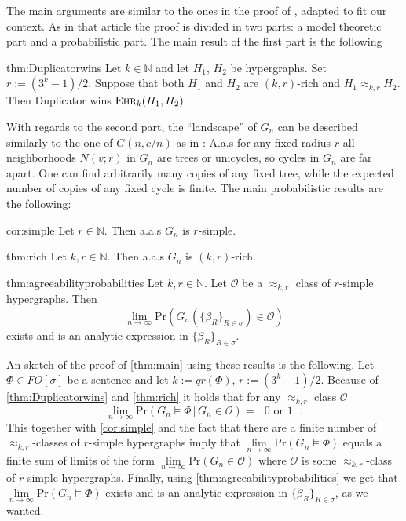 \documentclass[12pt,notitlepage,a4paper]{article}
\theoremstyle{definition}
\newcommand{\N}{\mathbb{N}}
\newcommand{\Ln}{\lim\limits_{n\to \infty}}
\newcommand{\ehr}{\textsc{Ehr}}
\newcommand{\PR}[1]{\mathrm{Pr}\left(#1\right)}
\begin{document}
The main arguments are similar to the ones in the proof of
 \cite[Theorem 2.1]{lynch1992probabilities},
adapted to fit our context. As in that
article the proof is divided in two parts: a model theoretic part and a 
probabilistic part. The main result of the first part is the following

\begin{reptheorem}{thm:Duplicatorwins}
	Let $k\in \N$ and let $H_1$, $H_2$ be hypergraphs. Set $r:=(3^k-1)/2$. Suppose
	that both $H_1$ and $H_2$ are $(k,r)$-rich and
	$H_1\approx_{k,r} H_2$. Then Duplicator wins $\ehr_{k}(H_1,H_2)$
\end{reptheorem}

With regards to the second part, 
the ``landscape'' of $G_n$ can be described similarly to the one 
of $G(n,c/n)$ as in \cite{shelah1994can}: A.a.s for any fixed radius $r$
all neighborhoods $N(v;r)$ in $G_n$ are trees or unicycles, so cycles in 
$G_n$ are far apart. One can find arbitrarily
many copies of any fixed tree, while the expected number of copies 
of any fixed cycle is finite. The main probabilistic results are the
following:
\begin{reptheorem}{cor:simple}
  	Let $r\in \N$. Then a.a.s $G_n$ is $r$-simple.
\end{reptheorem}

\begin{reptheorem}{thm:rich}
	Let $k,r\in \N$. Then a.a.s $G_n$ is $(k,r)$-rich.
\end{reptheorem}


\begin{reptheorem}{thm:agreeabilityprobabilities}
	Let $k,r \in \N$. Let $\mathcal{O}$ be a $\approx_{k,r}$ class
	of $r$-simple hypergraphs. Then 
	\[
	\Ln \mathrm{Pr}\left(G_n\left(\{\beta_R\}_{R\in \sigma}\right)\in \mathcal{O}\right)
	\]
	exists
	and is an analytic expression in $\{\beta_R\}_{R\in \sigma}$.
\end{reptheorem}

An sketch of the proof of \cref{thm:main} using these results is the following.
Let $\Phi\in FO[\sigma]$ be a sentence and let $k:=qr(\Phi)$, $r:=(3^k-1)/2$.
Because of \cref{thm:Duplicatorwins} and \cref{thm:rich}
it holds that for any $\approx_{k,r}$ class $\mathcal{O}$
\[
\Ln \mathrm{Pr}\left(G_n \models \Phi\, \big| \, G_n\in \mathcal{O} \right)= \text{ $0$ or $1$ }.
\]
This together with \cref{cor:simple}
and the fact that there are a finite number of
$\approx_{k,r}$-classes of $r$-simple hypergraphs imply that $\Ln \PR{G_n \models \Phi}$
equals a finite sum of limits of the form $\Ln \PR{G_n \in \mathcal{O}}$
where $\mathcal{O}$ is some $\approx_{k,r}$-class of $r$-simple hypergraphs.
Finally, using \cref{thm:agreeabilityprobabilities}
 we get that $\Ln \PR{G_n \models \Phi}$ exists and 
is an analytic expression in $\{\beta_R\}_{R\in \sigma}$, as we wanted. 
\end{document}

